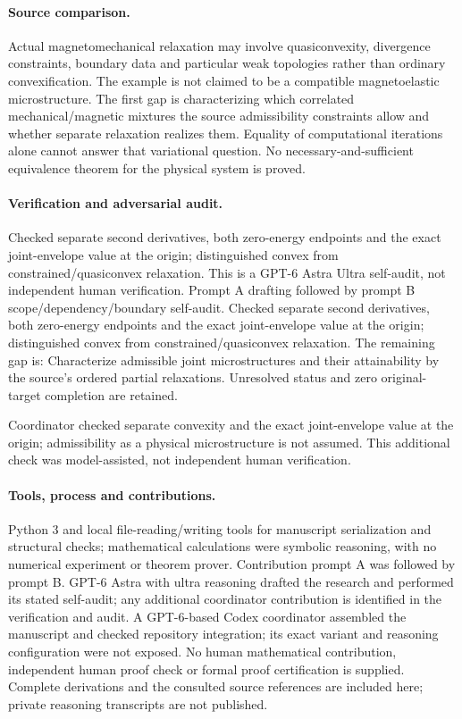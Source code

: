 \documentclass[11pt]{article}
\begin{document}
\paragraph{Source comparison.} Actual magnetomechanical relaxation may involve quasiconvexity, divergence constraints, boundary data and particular weak topologies rather than ordinary convexification. The example is not claimed to be a compatible magnetoelastic microstructure. The first gap is characterizing which correlated mechanical/magnetic mixtures the source admissibility constraints allow and whether separate relaxation realizes them. Equality of computational iterations alone cannot answer that variational question. No necessary-and-sufficient equivalence theorem for the physical system is proved.

\paragraph{Verification and adversarial audit.}
Checked separate second derivatives, both zero-energy endpoints and the exact joint-envelope value at the origin; distinguished convex from constrained/quasiconvex relaxation. This is a GPT-6 Astra Ultra self-audit, not independent human verification. Prompt A drafting followed by prompt B scope/dependency/boundary self-audit. Checked separate second derivatives, both zero-energy endpoints and the exact joint-envelope value at the origin; distinguished convex from constrained/quasiconvex relaxation. The remaining gap is: Characterize admissible joint microstructures and their attainability by the source’s ordered partial relaxations. Unresolved status and zero original-target completion are retained.

Coordinator checked separate convexity and the exact joint-envelope value at the origin; admissibility as a physical microstructure is not assumed. This additional check was model-assisted, not independent human verification.

\paragraph{Tools, process and contributions.}
Python 3 and local file-reading/writing tools for manuscript serialization and structural checks; mathematical calculations were symbolic reasoning, with no numerical experiment or theorem prover. Contribution prompt A was followed by prompt B. GPT-6 Astra with ultra reasoning drafted the research and performed its stated self-audit; any additional coordinator contribution is identified in the verification and audit. A GPT-6-based Codex coordinator assembled the manuscript and checked repository integration; its exact variant and reasoning configuration were not exposed. No human mathematical contribution, independent human proof check or formal proof certification is supplied. Complete derivations and the consulted source references are included here; private reasoning transcripts are not published.
\end{document}
